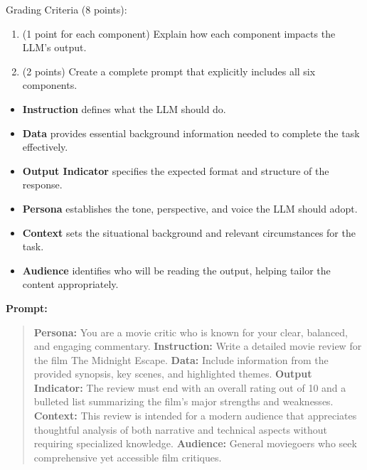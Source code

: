 \documentclass[11pt,addpoints,answers]{exam}
\begin{document}
\begin{questions}
Grading Criteria (8 points):
\begin{enumerate}
  \item (1 point for each component) Explain how each component impacts the LLM's output.
  \item (2 points) Create a complete prompt that explicitly includes all six components.
\end{enumerate}


\begin{solution}
\begin{itemize}
   \item \textbf{Instruction} defines what the LLM should do.
   \item \textbf{Data} provides essential background information needed to complete the task effectively.
   \item \textbf{Output Indicator} specifies the expected format and structure of the response.
   \item \textbf{Persona} establishes the tone, perspective, and voice the LLM should adopt.
   \item \textbf{Context} sets the situational background and relevant circumstances for the task.
   \item \textbf{Audience} identifies who will be reading the output, helping tailor the content appropriately.
\end{itemize}

\textbf{Prompt:}

\begin{quote}
\textbf{Persona:} You are a movie critic who is known for your clear, balanced, and engaging commentary.
\textbf{Instruction:} Write a detailed movie review for the film The Midnight Escape.
\textbf{Data:} Include information from the provided synopsis, key scenes, and highlighted themes.
\textbf{Output Indicator:} The review must end with an overall rating out of 10 and a bulleted list summarizing the film’s major strengths and weaknesses.
\textbf{Context:} This review is intended for a modern audience that appreciates thoughtful analysis of both narrative and technical aspects without requiring specialized knowledge.
\textbf{Audience:} General moviegoers who seek comprehensive yet accessible film critiques.
\end{quote}
\end{solution}
\end{questions}
\end{document}
